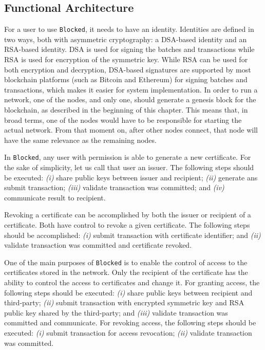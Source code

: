 \subsection{Functional Architecture}
\label{sec:design-interaction}

For a user to use \texttt{Blocked}, it needs to have an identity. Identities are defined in two ways, both with asymmetric cryptography: a DSA-based identity and an RSA-based identity. DSA \cite{cameron_f._kerry_digital_2013} is used for signing the batches and transactions while RSA \cite{rivest_method_1978} is used for encryption of the symmetric key. While RSA \cite{rivest_method_1978} can be used for both encryption and decryption, DSA-based signatures are supported by most blockchain platforms (such as Bitcoin and Ethereum) for signing batches and transactions, which makes it easier for system implementation. In order to run a network, one of the nodes, and only one, should generate a genesis block for the blockchain, as described in the beginning of this chapter. This means that, in broad terms, one of the nodes would have to be responsible for starting the actual network. From that moment on, after other nodes connect, that node will have the same relevance as the remaining nodes.

In \texttt{Blocked}, any user with permission is able to generate a new certificate. For the sake of simplicity, let us call that user an issuer. The following steps should be executed: \emph{(i)} share public keys between issuer and recipient; \emph{(ii)} generate ans submit transaction; \emph{(iii)} validate transaction was committed; and \emph{(iv)} communicate result to recipient.

Revoking a certificate can be accomplished by both the issuer or recipient of a certificate. Both have control to revoke a given certificate. The following steps should be accomplished: \emph{(i)} submit transaction with certificate identifier; and \emph{(ii)} validate transaction was committed and certificate revoked.

One of the main purposes of \texttt{Blocked} is to enable the control of access to the certificates stored in the network. Only the recipient of the certificate has the ability to control the access to certificates and change it. For granting access, the following steps should be executed: \emph{(i)} share public keys between recipient and third-party; \emph{(ii)} submit transaction with encrypted symmetric key and RSA public key shared by the third-party; and \emph{(iii)} validate transaction was committed and communicate. For revoking access, the following steps should be executed: \emph{(i)} submit transaction for access revocation; \emph{(ii)} validate transaction was committed.

